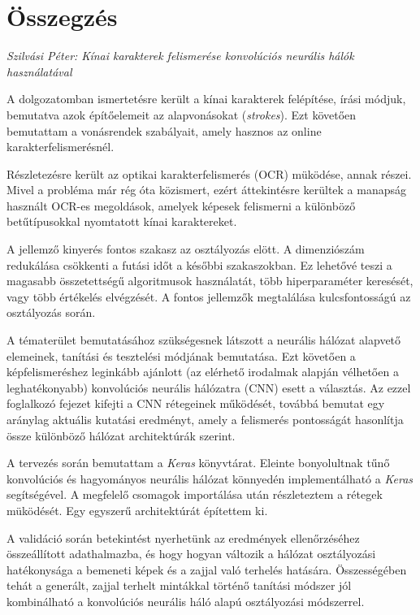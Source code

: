 \documentclass[a4paper,12pt]{article}
\begin{document}
\pagestyle{empty}

\section*{Összegzés}

\textit{Szilvási Péter: Kínai karakterek felismerése konvolúciós neurális hálók használatával}

\bigskip

A dolgozatomban ismertetésre került a kínai karakterek felépítése, írási módjuk, bemutatva azok építőelemeit az alapvonásokat (\textit{strokes}). Ezt követően bemutattam a vonásrendek szabályait, amely hasznos az online karakterfelismerésnél.

Részletezésre került az optikai karakterfelismerés (OCR) müködése, annak részei. Mivel a probléma már rég óta közismert, ezért áttekintésre kerültek a manapság használt OCR-es megoldások, amelyek képesek felismerni a különböző betűtípusokkal nyomtatott kínai karaktereket.

A jellemző kinyerés fontos szakasz az osztályozás elött. A dimenziószám redukálása csökkenti a futási időt a későbbi szakaszokban. Ez lehetővé teszi a magasabb összetettségű algoritmusok használatát, több hiperparaméter keresését, vagy több értékelés elvégzését. A fontos jellemzők megtalálása kulcsfontosságú az osztályozás során.

A tématerület bemutatásához szükségesnek látszott a neurális hálózat alapvető elemeinek, tanítási és tesztelési módjának bemutatása. Ezt követően a képfelismeréshez leginkább ajánlott (az elérhető irodalmak alapján vélhetően a leghatékonyabb) konvolúciós neurális hálózatra (CNN) esett a választás. Az ezzel foglalkozó fejezet kifejti a CNN rétegeinek működését, továbbá bemutat egy aránylag aktuális kutatási eredményt, amely a felismerés pontosságát hasonlítja össze különböző hálózat architektúrák szerint.

A tervezés során bemutattam a \textit{Keras} könyvtárat. Eleinte bonyolultnak tűnő konvolúciós és hagyományos neurális hálózat könnyedén implementálható a \textit{Keras} segítségével. A megfelelő csomagok importálása után részleteztem a rétegek müködését. Egy egyszerű architektúrát építettem ki.

A validáció során betekintést nyerhetünk az eredmények ellenőrzéséhez összeállított adathalmazba, és hogy hogyan változik a hálózat osztályozási hatékonysága a bemeneti képek és a zajjal való terhelés hatására. Összességében tehát a generált, zajjal terhelt mintákkal történő tanítási módszer jól kombinálható a konvolúciós neurális háló alapú osztályozási módszerrel.
\end{document}
